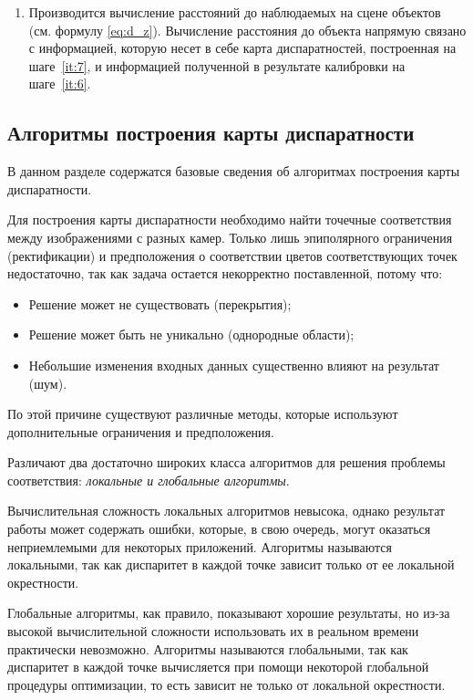 \documentclass[oneside,final,12pt]{scrartcl}
\begin{document}
\begin{enumerate}
				\item Производится вычисление расстояний до наблюдаемых на сцене объектов (см. формулу \eqref{eq:d_z}). Вычисление расстояния до объекта напрямую связано с информацией, которую несет в себе карта диспаратностей, построенная на шаге~\ref{it:7}, и информацией полученной в результате калибровки на шаге~\ref{it:6}. \label{it:8}
			\end{enumerate}

		\subsection{Алгоритмы построения карты диспаратности}
		\label{subsec:disp_algs}
			В данном разделе содержатся базовые сведения об алгоритмах построения карты диспаратности.

			Для построения карты диспаратности необходимо найти точечные соответствия между изображениями с разных камер. Только лишь эпиполярного ограничения (ректификации) и предположения	о соответствии цветов соответствующих точек недостаточно, так как задача остается	некорректно поставленной, потому что:
			\begin{itemize}
				\item Решение может не существовать (перекрытия);
				\item Решение может быть не уникально (однородные области);
				\item Небольшие изменения входных данных существенно влияют на результат (шум).
			\end{itemize}
			По этой причине существуют различные методы, которые используют дополнительные ограничения и предположения.

			Различают два достаточно широких класса алгоритмов для решения проблемы соответствия: \textit{локальные и глобальные алгоритмы}.

			Вычислительная сложность локальных алгоритмов невысока, однако результат работы может содержать ошибки, которые, в свою очередь, могут оказаться неприемлемыми для некоторых приложений. Алгоритмы называются локальными, так как диспаритет в каждой точке зависит только от ее локальной окрестности.

			Глобальные алгоритмы, как правило, показывают хорошие результаты, но из-за высокой вычислительной сложности использовать их в реальном времени практически невозможно. Алгоритмы называются глобальными, так как диспаритет в каждой точке вычисляется при помощи некоторой глобальной процедуры оптимизации, то есть зависит не только от локальной окрестности.
\end{document}
